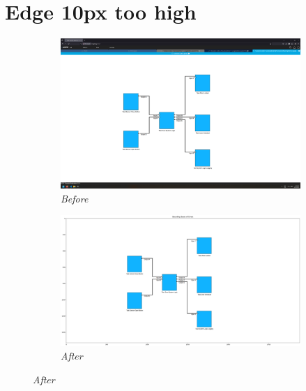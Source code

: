 \documentclass{article}
\begin{document}
\section{Edge 10px too high}
\begin{figure}[H]
    \centering
    \begin{subfigure}[t]{0.9\textwidth}
        \centering
        \includegraphics[width=\textwidth]{testcases/edge_10px_too_high/150452-500412_input_image.png}
        \caption*{\textit{Before}}
    \end{subfigure}
    \newline    
    \begin{subfigure}[t]{0.9\textwidth}
        \centering
        \includegraphics[width=\textwidth]{testcases/edge_10px_too_high/150513-636204_element_bbox_errors_labeled_colored.png}
        \caption*{\textit{After}}
    \end{subfigure}
    \label{fig:edge_too_high_10}
\end{figure}
\newpage
\end{document}
